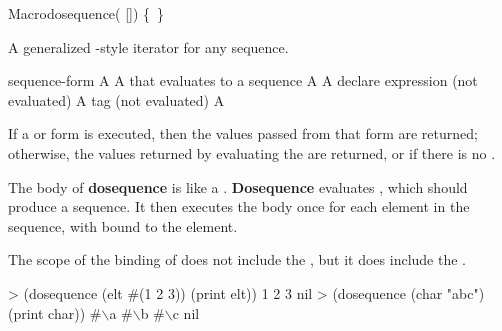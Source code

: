 \documentclass[10pt,twoside,english,pdftex]{article}
\begin{document}
\begin{functiondoc}{Macro}{dosequence}{( 
  []) \superstar{} 
  \mbox{\{ \vbar{} \}\superstar}
  \returns{} \superstar}
%
  
\fnsyntax

\fnpurpose A generalized -style iterator for any sequence.

\fnpackage {}

\fnmodule {}

\fnargs
\begin{args}{sequence-form}
\arg[var] A 
 A  that evaluates to a sequence
 A 
\arg[declarations] A declare expression (not evaluated)
\arg[tag] A  tag (not evaluated)
\arg[form] A 
\end{args}

\fnreturns If a  or  form is executed, then
the values passed from that form are returned; otherwise, the values
returned by evaluating the  are returned, or \nil{} if
there is no .

\fndescription The body of \textbf{dosequence} is like a .
\textbf{Dosequence} evaluates , which should produce a
sequence. It then executes the body once for each element in the sequence,
with  bound to the element.

The scope of the binding of  does not include the
, but it does include the .

\fnexamples
\begin{example}
> (dosequence (elt #(1 2 3)) (print elt))
1 
2 
3 
nil
> (dosequence (char "abc") (print char))
#\(\backslash\)a 
#\(\backslash\)b 
#\(\backslash\)c
nil
\end{example}

\end{functiondoc}

\end{document}
